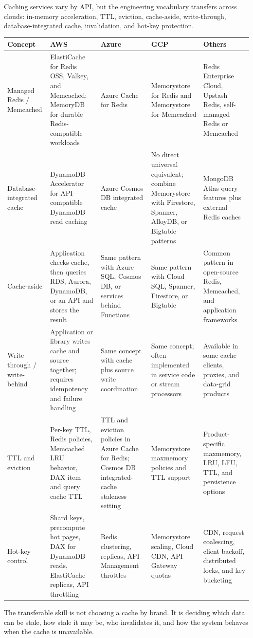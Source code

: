 \begin{crosscloud}
Caching services vary by API, but the engineering vocabulary transfers across clouds: in-memory acceleration, TTL, eviction, cache-aside, write-through, database-integrated cache, invalidation, and hot-key protection.
\vspace{2mm}
{\footnotesize
\begin{tabular}{@{}p{2.7cm}p{2.9cm}p{2.9cm}p{2.7cm}p{2.7cm}@{}}
\toprule
\textbf{Concept} & \textbf{AWS} & \textbf{Azure} & \textbf{GCP} & \textbf{Others} \\
\midrule
Managed Redis / Memcached & ElastiCache for Redis OSS, Valkey, and Memcached; MemoryDB for durable Redis-compatible workloads & Azure Cache for Redis & Memorystore for Redis and Memorystore for Memcached & Redis Enterprise Cloud, Upstash Redis, self-managed Redis or Memcached \\
Database-integrated cache & DynamoDB Accelerator for API-compatible DynamoDB read caching & Azure Cosmos DB integrated cache & No direct universal equivalent; combine Memorystore with Firestore, Spanner, AlloyDB, or Bigtable patterns & MongoDB Atlas query features plus external Redis caches \\
Cache-aside & Application checks cache, then queries RDS, Aurora, DynamoDB, or an API and stores the result & Same pattern with Azure SQL, Cosmos DB, or services behind Functions & Same pattern with Cloud SQL, Spanner, Firestore, or Bigtable & Common pattern in open-source Redis, Memcached, and application frameworks \\
Write-through / write-behind & Application or library writes cache and source together; requires idempotency and failure handling & Same concept with cache plus source write coordination & Same concept; often implemented in service code or stream processors & Available in some cache clients, proxies, and data-grid products \\
TTL and eviction & Per-key TTL, Redis policies, Memcached LRU behavior, DAX item and query cache TTL & TTL and eviction policies in Azure Cache for Redis; Cosmos DB integrated-cache staleness setting & Memorystore maxmemory policies and TTL support & Product-specific maxmemory, LRU, LFU, TTL, and persistence options \\
Hot-key control & Shard keys, precompute hot pages, DAX for DynamoDB reads, ElastiCache replicas, API throttling & Redis clustering, replicas, API Management throttles & Memorystore scaling, Cloud CDN, API Gateway quotas & CDN, request coalescing, client backoff, distributed locks, and key bucketing \\
\bottomrule
\end{tabular}}
\vspace{1mm}
The transferable skill is not choosing a cache by brand. It is deciding which data can be stale, how stale it may be, who invalidates it, and how the system behaves when the cache is unavailable.
\end{crosscloud}
